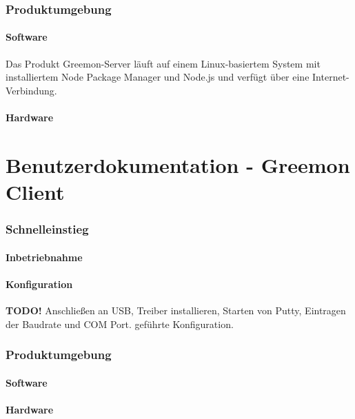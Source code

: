 \documentclass[pointlessnumbers]{scrartcl}
\begin{document}
\section{Produktumgebung}
\subsection{Software}
 Das Produkt Greemon-Server läuft auf einem Linux-basiertem System mit installiertem Node Package Manager und Node.js und verfügt über eine Internet-Verbindung.

\subsection{Hardware}
%
%






\newpage
\part{Benutzerdokumentation - Greemon Client}
\section{Schnelleinstieg}
    \subsection{Inbetriebnahme}
    \subsection{Konfiguration}
    \textbf{TODO!}
    Anschließen an USB, Treiber installieren, Starten von Putty, Eintragen der Baudrate und COM Port. geführte Konfiguration.

\section{Produktumgebung}
\subsection{Software}
%
%
\subsection{Hardware}
%
%
\end{document}
